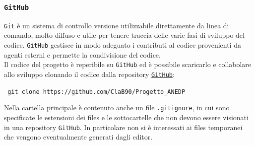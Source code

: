 \subsubsection{\texttt{GitHub}}
{\texttt{Git}} è un sistema di controllo versione utilizzabile direttamente da linea di comando, molto diffuso e utile per tenere traccia delle varie fasi di sviluppo del codice. \texttt{GitHub} gestisce in modo adeguato i contributi al codice provenienti da agenti esterni e permette la condivisione del codice.\\
Il codice del progetto è reperibile su \texttt{GitHub} ed è possibile scaricarlo e collabolare allo sviluppo clonando il codice dalla repository  \href{https://github.com/}{\texttt{GitHub}}:\\
\begin{center}
\texttt{ git clone https://github.com/ClaB90/Progetto\_ANEDP}
\end{center}
Nella cartella principale è contenuto anche un file \texttt{.gitignore}, in cui sono specificate le estensioni dei files e le sottocartelle che non devono essere visionati in una repository \texttt{GitHub}. In particolare non si è interessati ai files temporanei che vengono eventualmente generati dagli editor.

